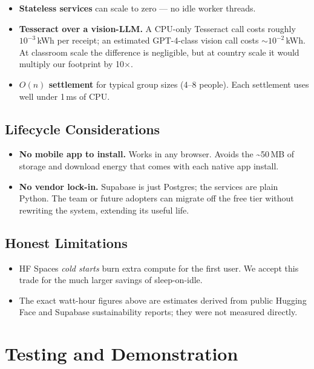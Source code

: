 \documentclass[11pt, a4paper]{article}
\begin{document}
\begin{itemize}[leftmargin=*]
\item \textbf{Stateless services} can scale to zero --- no idle worker threads.
\item \textbf{Tesseract over a vision-LLM.} A CPU-only Tesseract call costs roughly $10^{-3}$\,kWh per receipt; an estimated GPT-4-class vision call costs $\sim 10^{-2}$\,kWh. At classroom scale the difference is negligible, but at country scale it would multiply our footprint by 10$\times$.
\item \textbf{$O(n)$ settlement} for typical group sizes (4--8 people). Each settlement uses well under 1\,ms of CPU.
\end{itemize}

\subsection{Lifecycle Considerations}

\begin{itemize}[leftmargin=*]
\item \textbf{No mobile app to install.} Works in any browser. Avoids the \textasciitilde 50\,MB of storage and download energy that comes with each native app install.
\item \textbf{No vendor lock-in.} Supabase is just Postgres; the services are plain Python. The team or future adopters can migrate off the free tier without rewriting the system, extending its useful life.
\end{itemize}

\subsection{Honest Limitations}

\begin{itemize}[leftmargin=*]
\item HF Spaces \textit{cold starts} burn extra compute for the first user. We accept this trade for the much larger savings of sleep-on-idle.
\item The exact watt-hour figures above are estimates derived from public Hugging Face and Supabase sustainability reports; they were not measured directly.
\end{itemize}

\section{Testing and Demonstration}
\label{sec:testing}
\end{document}
